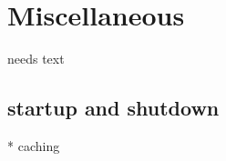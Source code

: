 \documentclass[a4paper,10pt,twoside]{book}
\begin{document}
\section{Miscellaneous}
needs text

\subsection{startup and shutdown}
  * caching
  
\begin{table}
\begin{center}
\caption{Numbers of distinct differentiable structures on real $n$-space
and $n$-spheres}
\label{diffstruc}
\end{center}
\end{table}


\ifx\wholebook\relax\else
   
   
\end{document}
